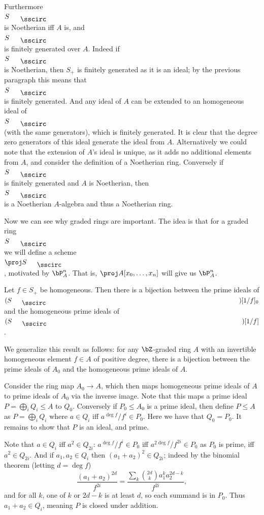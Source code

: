 Furthermore $S_\bul$ is Noetherian iff $A$ is, and $S_\bul$ is finitely generated over $A$.
Indeed if $S_\bul$ is Noetherian, then $S_+$ is finitely generated as it is an ideal; by the previous paragraph this means that $S_\bul$ is finitely generated.
And any ideal of $A$ can be extended to an homogeneous ideal of $S_\bul$ (with the same generators), which is finitely generated.
It is clear that the degree zero generators of this ideal generate the ideal from $A$.
Alternatively we could note that the extension of $A$'s ideal is unique, as it adds no additional elements from $A$, and consider the definition of a Noetherian ring.
Conversely if $S_\bul$ is finitely generated and $A$ is Noetherian, then $S_\bul$ is a Noetherian $A$-algebra and thus a Noetherian ring.

Now we can see why graded rings are important.
The idea is that for a graded ring $S_\bul$ we will define a scheme $\proj S_\bul$, motivated by $\bP^n_A$.
That is, $\proj A[x_0,\dots,x_n]$ will give us $\bP^n_A$.

\bprop

    Let $f\in S_+$ be homogeneous.
    Then there is a bijection between the prime ideals of $(S_\bul)[1/f]_0$ and the homogeneous prime ideals of $(S_\bul)[1/f]$.

\eprop

\bproof

    We generalize this result as follows: for any $\bZ$-graded ring $A$ with an invertible homogeneous element $f\in A$ of positive degree,
    there is a bijection between the prime ideals of $A_0$ and the homogeneous prime ideals of $A$.

    Consider the ring map $A_0\to A$, which then maps homogeneous prime ideals of $A$ to prime ideals of $A_0$ via the inverse image.
    Note that this maps a prime ideal $P=\bigoplus_iQ_i\leq A$ to $Q_0$.
    Conversely if $P_0\leq A_0$ is a prime ideal, then define $P\leq A$ as $P=\bigoplus_iQ_i$ where $a\in Q_i$ iff $a^{\deg f}/f^i\in P_0$.
    Here we have that $Q_0=P_0$.
    It remains to show that $P$ is an ideal, and prime.

    Note that $a\in Q_i$ iff $a^2\in Q_{2i}$: $a^{\deg f}/f^i\in P_0$ iff $a^{2\deg f}/f^{2i}\in P_0$ as $P_0$ is prime, iff $a^2\in Q_{2i}$.
    And if $a_1,a_2\in Q_i$ then $(a_1+a_2)^2\in Q_{2i}$; indeed by the binomial theorem (letting $d=\deg f$)
    $$ \frac{(a_1+a_2)^{2d}}{f^{2i}} = \frac{\sum_k\binom{2d}ka_1^ka_2^{2d-k}}{f^{2i}} , $$
    and for all $k$, one of $k$ or $2d-k$ is at least $d$, so each summand is in $P_0$.
    Thus $a_1+a_2\in Q_i$, meaning $P$ is closed under addition.

